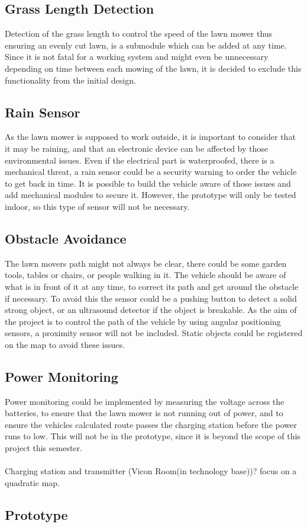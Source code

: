 \subsection{Grass Length Detection}
Detection of the grass length to control the speed of the lawn mower thus ensuring an evenly cut lawn, is a submodule which can be added at any time. Since it is not fatal for a working system and might even be unnecessary depending on time between each mowing of the lawn, it is decided to exclude this functionality from the initial design.

\subsection{Rain Sensor}
As the lawn mower is supposed to work outside, it is important to consider that it may be raining, and that an electronic device can be affected by those environmental issues. Even if the electrical part is waterproofed, there is a mechanical threat, a rain sensor could be a security warning to order the vehicle to get back in time.
It is possible to build the vehicle aware of those issues and add mechanical modules to secure it. However, the prototype will only be tested indoor, so this type of sensor will not be necessary.

\subsection{Obstacle Avoidance}
The lawn movers path might not always be clear, there could be some garden tools, tables or chairs, or people walking in it. The vehicle should be aware of what is in front of it at any time, to correct its path and get around the obstacle if necessary. To avoid this the sensor could be a pushing button to detect a solid strong object, or an ultrasound detector if the object is breakable.
As the aim of the project is to control the path of the vehicle by using angular positioning sensors, a proximity sensor will not be included. Static objects could be registered on the map to avoid these issues.

\subsection{Power Monitoring}
Power monitoring could be implemented by measuring the voltage across the batteries, to ensure that the lawn mower is not running out of power, and to ensure the vehicles calculated route passes the charging station before the power runs to low. 
This will not be in the prototype, since it is beyond the scope of this project this semester.\\\\

Charging station and transmitter (Vicon Room(in technology base))? focus on a quadratic map. 

\subsection{Prototype}


